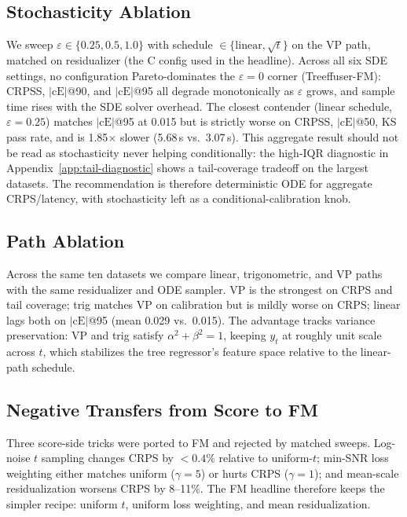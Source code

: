 \documentclass{uai2026}
\begin{document}
\subsection{Stochasticity Ablation}\label{sec:abl-sde}
We sweep $\varepsilon \in \{0.25, 0.5, 1.0\}$ with schedule $\in \{\text{linear},\sqrt{t}\}$ on the VP path, matched on residualizer (the C config used in the headline). Across all six SDE settings, no configuration Pareto-dominates the $\varepsilon = 0$ corner (Treeffuser-FM): CRPSS, $|\text{cE}|$@90, and $|\text{cE}|$@95 all degrade monotonically as $\varepsilon$ grows, and sample time rises with the SDE solver overhead. The closest contender (linear schedule, $\varepsilon=0.25$) matches $|\text{cE}|$@95 at 0.015 but is strictly worse on CRPSS, $|\text{cE}|$@50, KS pass rate, and is 1.85$\times$ slower (5.68\,s vs.\ 3.07\,s). This aggregate result should not be read as stochasticity never helping conditionally: the high-IQR diagnostic in Appendix~\ref{app:tail-diagnostic} shows a tail-coverage tradeoff on the largest datasets. The recommendation is therefore deterministic ODE for aggregate CRPS/latency, with stochasticity left as a conditional-calibration knob.

\subsection{Path Ablation}\label{sec:abl-path}
Across the same ten datasets we compare linear, trigonometric, and VP paths with the same residualizer and ODE sampler. VP is the strongest on CRPS and tail coverage; trig matches VP on calibration but is mildly worse on CRPS; linear lags both on $|\text{cE}|$@95 (mean 0.029 vs.\ 0.015). The advantage tracks variance preservation: VP and trig satisfy $\alpha^2 + \beta^2 = 1$, keeping $y_t$ at roughly unit scale across $t$, which stabilizes the tree regressor's feature space relative to the linear-path schedule.

\subsection{Negative Transfers from Score to FM}\label{sec:abl-negative}
Three score-side tricks were ported to FM and rejected by matched sweeps. Log-noise $t$ sampling changes CRPS by $<0.4\%$ relative to uniform-$t$; min-SNR loss weighting either matches uniform ($\gamma=5$) or hurts CRPS ($\gamma=1$); and mean-scale residualization worsens CRPS by 8--11\%. The FM headline therefore keeps the simpler recipe: uniform $t$, uniform loss weighting, and mean residualization.
\end{document}
